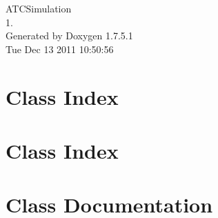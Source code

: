 \documentclass[a4paper]{book}
\begin{document}
\hypersetup{pageanchor=false,citecolor=blue}
\begin{titlepage}
\vspace*{7cm}
\begin{center}
{\Large \-A\-T\-C\-Simulation \\[1ex]\large 1. }\\
\vspace*{1cm}
{\large \-Generated by Doxygen 1.7.5.1}\\
\vspace*{0.5cm}
{\small Tue Dec 13 2011 10:50:56}\\
\end{center}
\end{titlepage}
\clearemptydoublepage
{}
\tableofcontents
\clearemptydoublepage
{}
\hypersetup{pageanchor=true,citecolor=blue}
\chapter{\-Class \-Index}

\chapter{\-Class \-Index}

\chapter{\-Class \-Documentation}

















\printindex
\end{document}

